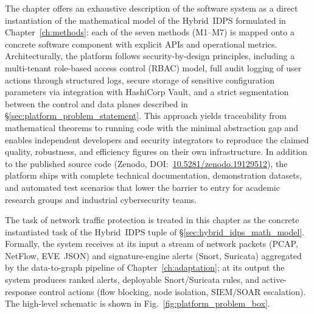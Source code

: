 The chapter offers an exhaustive description of the software
system as a direct instantiation of the mathematical model of the
Hybrid~IDPS formulated in Chapter~\ref{ch:methods}: each of the
seven methods (M1--M7) is mapped onto a concrete software
component with explicit APIs and operational metrics.
Architecturally, the platform follows security-by-design
principles, including a multi-tenant role-based access control
(RBAC) model, full audit logging of user actions through
structured logs, secure storage of sensitive configuration
parameters via integration with HashiCorp Vault, and a strict
segmentation between the control and data planes described in
\S\ref{sec:platform_problem_statement}. This approach yields
traceability from mathematical theorems to running code with the
minimal abstraction gap and enables independent developers and
security integrators to reproduce the claimed quality, robustness,
and efficiency figures on their own infrastructure. In addition
to the published source code (Zenodo,
DOI:~\url{10.5281/zenodo.19129512}), the platform ships with
complete technical documentation, demonstration datasets, and
automated test scenarios that lower the barrier to entry for
academic research groups and industrial cybersecurity teams.

\label{sec:platform_problem_statement}%

The task of network traffic protection is treated in this chapter as
the concrete instantiated task of the Hybrid~IDPS tuple of
\S\ref{sec:hybrid_idps_math_model}. Formally, the system receives at
its input a stream of network packets (PCAP, NetFlow, EVE~JSON) and
signature-engine alerts (Snort, Suricata) aggregated by the
data-to-graph pipeline of Chapter~\ref{ch:adaptation}; at its
output the system produces ranked alerts, deployable Snort/Suricata
rules, and active-response control actions (flow blocking, node
isolation, SIEM/SOAR escalation). The high-level schematic is
shown in Fig.~\ref{fig:platform_problem_box}.


